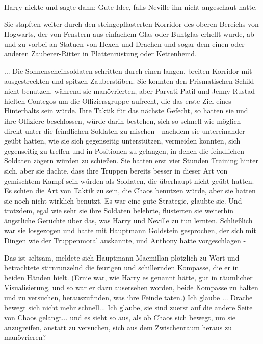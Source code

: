Harry nickte und sagte dann: \glqq Gute Idee\grqq{}, falls Neville ihn nicht
angeschaut hatte.

Sie stapften weiter durch den steingepflasterten Korridor des oberen Bereichs
von Hogwarts, der von Fenstern aus einfachem Glas oder Buntglas erhellt wurde,
ab und zu vorbei an Statuen von Hexen und Drachen und sogar dem einen oder
anderen Zauberer-Ritter in Plattenrüstung oder Kettenhemd.

... Die Sonnenscheinsoldaten schritten durch einen langen, breiten Korridor mit
ausgestreckten und spitzen Zauberstäben. Sie konnten den Prismatischen Schild
nicht benutzen, während sie manövrierten, aber Parvati Patil und Jenny Rustad
hielten Contegos um die Offiziersgruppe aufrecht, die das erste Ziel eines
Hinterhalts sein würde. Ihre Taktik für das nächste Gefecht, so hatten sie und
ihre Offiziere beschlossen, würde darin bestehen, sich so schnell wie möglich
direkt unter die feindlichen Soldaten zu mischen - nachdem sie untereinander
geübt hatten, wie sie sich gegenseitig unterstützen, vermeiden konnten, sich
gegenseitig zu treffen und in Positionen zu gelangen, in denen die feindlichen
Soldaten zögern würden zu schießen. Sie hatten erst vier Stunden Training hinter
sich, aber sie dachte, dass ihre Truppen bereits besser in dieser Art von
gemischtem Kampf sein würden als Soldaten, die überhaupt nicht geübt hatten. Es
schien die Art von Taktik zu sein, die Chaos benutzen würde, aber sie hatten sie
noch nicht wirklich benutzt. Es war eine gute Strategie, glaubte sie. Und
trotzdem, egal wie sehr sie ihre Soldaten belehrte, flüsterten sie weiterhin
ängstliche Gerüchte über das, was Harry und Neville zu tun lernten. Schließlich
war sie losgezogen und hatte mit Hauptmann Goldstein gesprochen, der sich mit
Dingen wie der Truppenmoral auskannte, und Anthony hatte vorgeschlagen -

\glqq Das ist seltsam\grqq{}, meldete sich Hauptmann Macmillan plötzlich zu Wort
und betrachtete stirnrunzelnd die feurigen und schillernden Kompasse, die er in
beiden Händen hielt. (Ernie war, wie Harry es genannt hätte, \glqq gut in
räumlicher Visualisierung\grqq{}, und so war er dazu ausersehen worden, beide
Kompasse zu halten und zu versuchen, herauszufinden, was ihre Feinde taten.)
\glqq Ich glaube ... Drache bewegt sich nicht mehr schnell... Ich glaube, sie
sind zuerst auf die andere Seite von Chaos gelangt... und es sieht so aus, als
ob Chaos sich bewegt, um sie anzugreifen, anstatt zu versuchen, sich aus dem
Zwischenraum heraus zu manövrieren?\grqq{}


